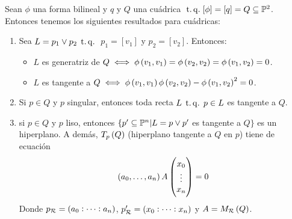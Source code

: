 \begin{prop}
 Sean $\phi$ una forma bilineal y $q$ y $Q$ una cuádrica $\operatorname{\;t.q.\;} [\phi]=[q]=Q\subseteq \mathbb{P}^2$.
 Entonces tenemos los siguientes resultados para cuádricas:
 \begin{enumerate}[(1)]
  \item Sea $L=p_1\vee p_2 \operatorname{\;t.q.\;}$ $p_1=[v_1]$ y $p_2=[v_2]$. Entonces:
  \begin{itemize}
   \item $L$ es generatriz de $Q \iff \phi \left( v_1,v_1\right) = \phi
   \left( v_2,v_2 \right) = \phi \left( v_1,v_2 \right) =0$.
   \item $L$ es tangente a $Q \iff \phi \left( v_1,v_1 \right) \phi \left( v_2,v_2 \right)
   - \phi \left( v_1,v_2 \right) ^2 =0$.
  \end{itemize}
  \item Si $p\in Q$ y $p$ singular, entonces toda recta $L \operatorname{\;t.q.\;} p\in L$ es tangente a $Q$.
  \item si $p\in Q$ y $p$ liso, entonces $\{ p'\subseteq \mathbb{P}^n | L=p\vee p'$ es tangente a $Q \}$
  es un hiperplano. A demás, $T_p\left( Q \right)$ (hiperplano tangente a $Q$ en $p$) tiene de ecuación
  \[
   \left( a_0,\dots,a_n \right) A 
   \begin{pmatrix}
    x_0\\
    \vdots\\
    x_n\\
   \end{pmatrix} = 0
  \]
  Donde $p_{\mathcal{R}} = \left( a_0:\dots :a_n\right)$, $p'_{\mathcal{R}} = \left( x_0:\dots :x_n\right)$ y $A = M_{\mathcal{R}} \left( Q \right)$.
 \end{enumerate}
\end{prop}
